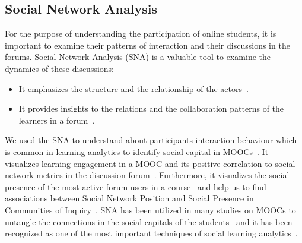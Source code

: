 \documentclass[manuscript,screen,review]{acmart}
\begin{document}
\subsection{Social Network Analysis}
For the purpose of understanding  the participation of online students, it is important to examine their patterns of interaction and their discussions in the forums. Social Network Analysis (SNA) is a valuable tool to examine the dynamics of these discussions: 
\begin{itemize}
    \item It emphasizes the structure and the relationship of the 
actors~\cite{butts2008social}.
    \item It provides insights to the relations and the collaboration patterns of the learners in a forum~\cite{rabbany2014collaborative}.
\end{itemize}
We used the SNA to understand about participants interaction behaviour which is common in learning analytics to identify social capital in MOOCs~\cite{joksimovic2015you}. It visualizes learning engagement in a MOOC and its positive correlation to social network metrics in the discussion forum~\cite{yang2013turn}. Furthermore, it visualizes the social presence of the most active forum users in a course~\cite{oleksandra2016untangling} and help us to find associations between Social Network Position and Social Presence in Communities of Inquiry~\cite{joksimovic2015you,kovanovic2014source}. SNA has been utilized in many studies on MOOCs to untangle the connections in the social capitals of the students~\cite{oleksandra2016untangling,kovanovic2014source} and it has been recognized as one of the most important techniques of social learning analytics~\cite{shum2012social,ferguson2012social}.
\end{document}
